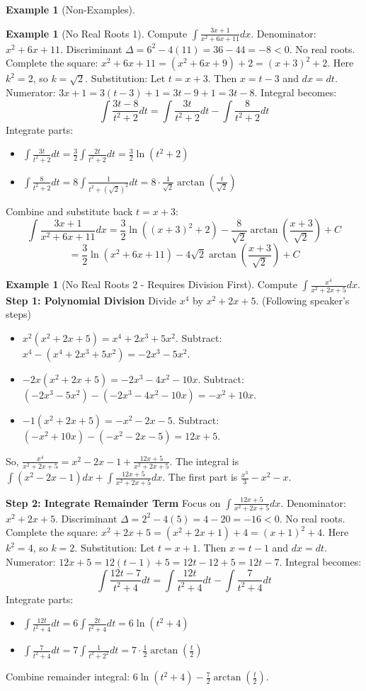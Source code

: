 \documentclass[11pt]{article}
\theoremstyle{plain}
\theoremstyle{definition}
\newtheorem{example}[theorem]{Example}
\theoremstyle{remark}
\begin{document}
\begin{example}[Non-Examples]
\begin{example}[No Real Roots 1]
Compute $\int \frac{3x+1}{x^2+6x+11} dx$.
Denominator: $x^2+6x+11$. Discriminant $\Delta = 6^2 - 4(11) = 36-44 = -8 < 0$. No real roots.
Complete the square: $x^2+6x+11 = (x^2+6x+9) + 2 = (x+3)^2 + 2$. Here $k^2=2$, so $k=\sqrt{2}$.
Substitution: Let $t = x+3$. Then $x=t-3$ and $dx=dt$.
Numerator: $3x+1 = 3(t-3)+1 = 3t-9+1 = 3t-8$.
Integral becomes:
\[ \int \frac{3t-8}{t^2+2} dt = \int \frac{3t}{t^2+2} dt - \int \frac{8}{t^2+2} dt \]
Integrate parts:
\begin{itemize}
    \item $\int \frac{3t}{t^2+2} dt = \frac{3}{2} \int \frac{2t}{t^2+2} dt = \frac{3}{2} \ln(t^2+2)$
    \item $\int \frac{8}{t^2+2} dt = 8 \int \frac{1}{t^2+(\sqrt{2})^2} dt = 8 \cdot \frac{1}{\sqrt{2}} \arctan\left(\frac{t}{\sqrt{2}}\right)$
\end{itemize}
Combine and substitute back $t=x+3$:
\[ \int \frac{3x+1}{x^2+6x+11} dx = \frac{3}{2} \ln((x+3)^2+2) - \frac{8}{\sqrt{2}} \arctan\left(\frac{x+3}{\sqrt{2}}\right) + C \]
\[ = \frac{3}{2} \ln(x^2+6x+11) - 4\sqrt{2} \arctan\left(\frac{x+3}{\sqrt{2}}\right) + C \]
\end{example}

\begin{example}[No Real Roots 2 - Requires Division First]
Compute $\int \frac{x^4}{x^2+2x+5} dx$.
\textbf{Step 1: Polynomial Division}
Divide $x^4$ by $x^2+2x+5$. (Following speaker's steps)
\begin{itemize}
    \item $x^2(x^2+2x+5) = x^4+2x^3+5x^2$. Subtract: $x^4 - (x^4+2x^3+5x^2) = -2x^3-5x^2$.
    \item $-2x(x^2+2x+5) = -2x^3-4x^2-10x$. Subtract: $(-2x^3-5x^2) - (-2x^3-4x^2-10x) = -x^2+10x$.
    \item $-1(x^2+2x+5) = -x^2-2x-5$. Subtract: $(-x^2+10x) - (-x^2-2x-5) = 12x+5$.
\end{itemize}
So, $\frac{x^4}{x^2+2x+5} = x^2-2x-1 + \frac{12x+5}{x^2+2x+5}$.
The integral is $\int (x^2-2x-1) dx + \int \frac{12x+5}{x^2+2x+5} dx$.
The first part is $\frac{x^3}{3} - x^2 - x$.

\textbf{Step 2: Integrate Remainder Term}
Focus on $\int \frac{12x+5}{x^2+2x+5} dx$.
Denominator: $x^2+2x+5$. Discriminant $\Delta = 2^2 - 4(5) = 4-20 = -16 < 0$. No real roots.
Complete the square: $x^2+2x+5 = (x^2+2x+1)+4 = (x+1)^2+4$. Here $k^2=4$, so $k=2$.
Substitution: Let $t=x+1$. Then $x=t-1$ and $dx=dt$.
Numerator: $12x+5 = 12(t-1)+5 = 12t-12+5 = 12t-7$.
Integral becomes:
\[ \int \frac{12t-7}{t^2+4} dt = \int \frac{12t}{t^2+4} dt - \int \frac{7}{t^2+4} dt \]
Integrate parts:
\begin{itemize}
    \item $\int \frac{12t}{t^2+4} dt = 6 \int \frac{2t}{t^2+4} dt = 6 \ln(t^2+4)$
    \item $\int \frac{7}{t^2+4} dt = 7 \int \frac{1}{t^2+2^2} dt = 7 \cdot \frac{1}{2} \arctan\left(\frac{t}{2}\right)$
\end{itemize}
Combine remainder integral: $6 \ln(t^2+4) - \frac{7}{2} \arctan\left(\frac{t}{2}\right)$.


\end{example}
\end{example}
\end{document}
